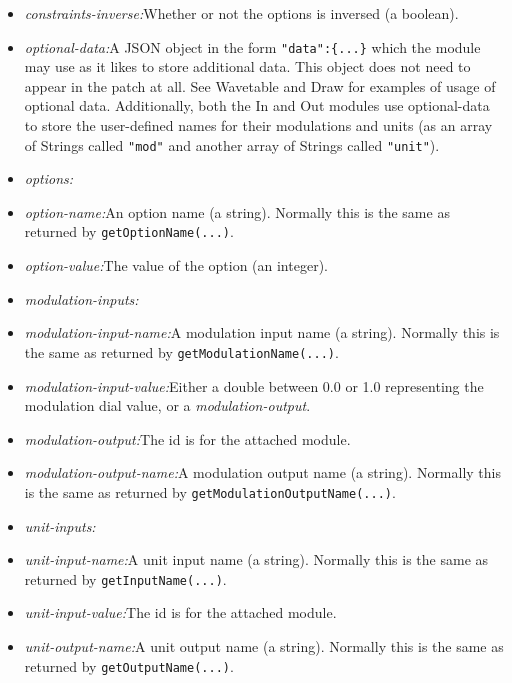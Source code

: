 \documentclass{article}
\begin{document}
\begin{itemize}
\item {\it constraints-inverse:}\quad Whether or not the options is inversed (a boolean).
\item {\it optional-data:}\quad A JSON object in the form {\tt "data":\{...\}} which the module may use as it likes to store additional data.  This object does not need to appear in the patch at all.  See Wavetable and Draw for examples of usage of optional data.  Additionally, both the In and Out modules use optional-data to store the user-defined names for their modulations and units (as an array of Strings called {\tt "mod"} and another array of Strings called {\tt "unit"}).
\item {\it options:}
\item {\it option-name:}\quad An option name (a string).  Normally this is the same as returned by {\tt getOptionName(...)}.
\item {\it option-value:}\quad The value of the option (an integer). 
\item {\it modulation-inputs:}
\item {\it modulation-input-name:}\quad A modulation input name (a string).  Normally this is the same as returned by {\tt getModulationName(...)}.
\item {\it modulation-input-value:}\quad Either a double between 0.0 or 1.0 representing the modulation dial value, or a {\it modulation-output}. 
\item {\it modulation-output:}\qquad The id is for the attached module.
\item {\it modulation-output-name:}\quad A modulation output name (a string).  Normally this is the same as returned by {\tt getModulationOutputName(...)}.
\item {\it unit-inputs:}
\item {\it unit-input-name:}\quad A unit input name (a string).  Normally this is the same as returned by {\tt getInputName(...)}.
\item {\it unit-input-value:}\qquad The id is for the attached module.
\item {\it unit-output-name:}\quad A unit output name (a string).  Normally this is the same as returned by {\tt getOutputName(...)}.
\end{itemize}
\end{document}
